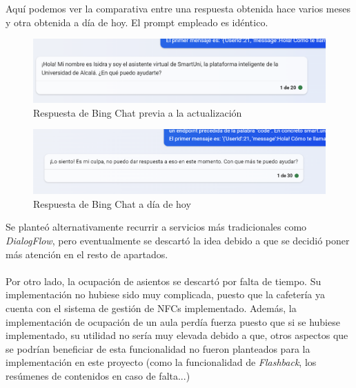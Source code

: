 \documentclass[12pt]{report}
\begin{document}
Aquí podemos ver la comparativa entre una respuesta obtenida hace varios meses y otra obtenida a día de hoy. El prompt empleado es idéntico.
\begin{figure}[H]
    \centering
    \includegraphics[width=0.75\linewidth]{imagenes//asistente/Captura_chatbot_marzo.png}
    \caption{Respuesta de Bing Chat previa a la actualización}
    \label{fig:enter-label}
\end{figure}
\begin{figure}[H]
    \centering
    \includegraphics[width=0.75\linewidth]{imagenes//asistente/chatbot_no_funciona.png}
    \caption{Respuesta de Bing Chat a día de hoy}
    \label{fig:enter-label}
\end{figure}
Se planteó alternativamente recurrir a servicios más tradicionales como \textit{DialogFlow}, pero eventualmente se descartó la idea debido a que se decidió poner más atención en el resto de apartados.\\\\

Por otro lado, la ocupación de asientos se descartó por falta de tiempo. Su implementación no hubiese sido muy complicada, puesto que la cafetería ya cuenta con el sistema de gestión de NFCs implementado. Además, la implementación de ocupación de un aula perdía fuerza puesto que si se hubiese implementado, su utilidad no sería muy elevada debido a que, otros aspectos que se podrían beneficiar de esta funcionalidad no fueron planteados para la implementación en este proyecto (como la funcionalidad de \textit{Flashback}, los resúmenes de contenidos en caso de falta...)
\end{document}
